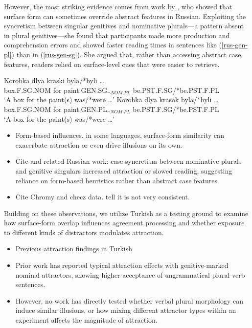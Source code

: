 \documentclass[
  authoryear,
  preprint]{elsarticle}
\providecommand{\tightlist}{%
  \setlength{\itemsep}{0pt}\setlength{\parskip}{0pt}}
\begin{document}
However, the most striking evidence comes from work by
\citet{Slioussar2018}, who showed that surface form can sometimes
override abstract features in Russian. Exploiting the syncretism between
singular genitives and nominative plurals---a pattern absent in plural
genitives---she found that participants made more production and
comprehension errors and showed faster reading times in sentences like
(\ref{rus-gen-pl}) than in (\ref{rus-gen-sg}). She argued that, rather
than accessing abstract case features, readers relied on surface-level
cues that were easier to retrieve.

\begin{exe}
\ex \label{rus}
\begin{xlist}
\ex \label{rus-gen-sg}
\gll Korobka dlya kraski byla/*byli \ldots \\
box.F.SG.NOM for paint.GEN.SG$_{\neg NOM.PL}$ be.PST.F.SG/*be.PST.F.PL \\
\glt `A box for the paint(s) was/*were \dots'
\ex \label{rus-gen-pl}
\gll Korobka dlya krasok byla/*byli \ldots \\
box.F.SG.NOM for paint.GEN.PL$_{\neg NOM.PL}$ be.PST.F.SG/*be.PST.F.PL \\
\glt `A box for the paint(s) was/*were \dots'
\end{xlist}
\end{exe}

\begin{itemize}
\tightlist
\item
  Form-based influences. in some languages, surface-form similarity can
  exacerbate attraction or even drive illusions on its own.
\item
  Cite \citet{Slioussar2018} and related Russian work: case syncretism
  between nominative plurals and genitive singulars increased attraction
  or slowed reading, suggesting reliance on form-based heuristics rather
  than abstract case features.
\item
  Cite Chromy and checz data. tell it is not very consistent.
\end{itemize}

Building on these observations, we utilize Turkish as a testing ground
to examine how surface-form overlap influences agreement processing and
whether exposure to different kinds of distractors modulates attraction.

\begin{itemize}
\tightlist
\item
  Previous attraction findings in Turkish
\item
  Prior work has reported typical attraction effects with
  genitive-marked nominal attractors, showing higher acceptance of
  ungrammatical plural-verb sentences.
\item
  However, no work has directly tested whether verbal plural morphology
  can induce similar illusions, or how mixing different attractor types
  within an experiment affects the magnitude of attraction.
\end{itemize}
\end{document}
